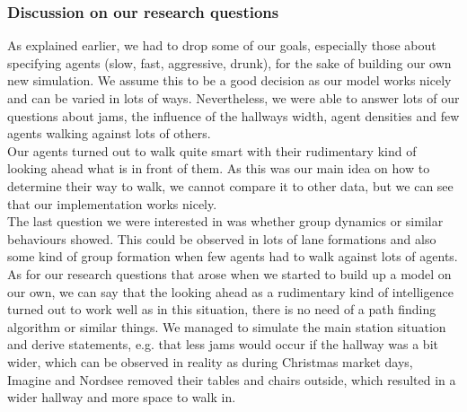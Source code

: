 \subsubsection{Discussion on our research questions}
As explained earlier, we had to drop some of our goals, especially those about specifying agents (slow, fast, aggressive, drunk), for the sake of building our own new simulation. We assume this to be a good decision as our model works nicely and can be varied in lots of ways. Nevertheless, we were able to answer lots of our questions about jams, the influence of the hallways width, agent densities and few agents walking against lots of others.\\
Our agents turned out to walk quite smart with their rudimentary kind of looking ahead what is in front of them. As this was our main idea on how to determine their way to walk, we cannot compare it to other data, but we can see that our implementation works nicely.\\
The last question we were interested in was whether group dynamics or similar behaviours showed. This could be observed in lots of lane formations and also some kind of group formation when few agents had to walk against lots of agents.\\
As for our research questions that arose when we started to build up a model on our own, we can say that the looking ahead as a rudimentary kind of intelligence turned out to work well as in this situation, there is no need of a path finding algorithm or similar things. We managed to simulate the main station situation and derive statements, e.g. that less jams would occur if the hallway was a bit wider, which can be observed in reality as during Christmas market days, Imagine and Nordsee removed their tables and chairs outside, which resulted in a wider hallway and more space to walk in.
